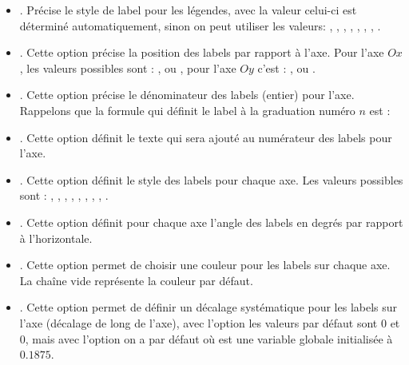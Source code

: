 \begin{itemize}
\begin{itemize}
            \item {}. Précise le style de label pour les légendes, avec la valeur  celui-ci est déterminé automatiquement, sinon on peut utiliser les valeurs: , , , , , , , .
            
            \item {}. Cette option précise la position des labels par rapport à l'axe. Pour l'axe $Ox$, les valeurs possibles sont : ,  ou , pour l'axe $Oy$ c'est :  ,  ou .
            
            \item {}. Cette option précise le dénominateur des labels (entier) pour l'axe. Rappelons que la formule qui définit le label à la graduation numéro $n$ est : 
            
            \item {}. Cette option définit le texte qui sera ajouté au numérateur des labels pour l'axe.
            
            \item {}. Cette option définit le style des labels pour chaque axe. Les valeurs possibles sont : , , , , , , , , .
            
            \item {}. Cette option définit pour chaque axe l'angle des labels en degrés par rapport à l'horizontale.
            
            \item {}. Cette option permet de choisir une couleur pour les labels sur chaque axe. La chaîne vide représente la couleur par défaut.
            
            \item {}. Cette option permet de définir un décalage systématique pour les labels sur l'axe (décalage de long de l'axe), avec l'option  les valeurs par défaut sont $0$ et $0$, mais avec l'option  on a par défaut  où  est une variable globale initialisée à $0.1875$.
            

\end{itemize}
\end{itemize}
